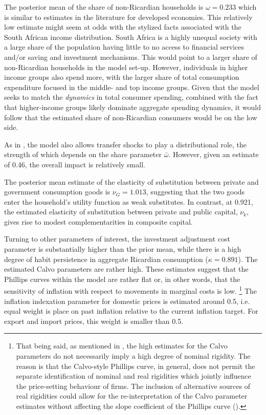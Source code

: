 \documentclass[a4paper,11pt]{article}
\numberwithin{equation}{section}
\begin{document}
	The posterior mean of the share of non-Ricardian households is $\omega=0.233$ which is similar to estimates in the literature for developed economies. This relatively low estimate might seem at odds with the stylized facts associated with the South African income distribution. South Africa is a highly unequal society with a large share of the population having little to no access to financial services and/or saving and investment mechanisms. This would point to a larger share of non-Ricardian households in the model set-up. However, individuals in higher income groups also spend more, with the larger share of total consumption expenditure focused in the middle- and top income groups. Given that the model seeks to match the \textit{dynamics} in total consumer spending, combined with the fact that higher-income groups likely dominate aggregate spending dynamics, it would follow that the estimated share of non-Ricardian consumers would be on the low side.
	
	As in \cite{coenen2013}, the model also allows transfer shocks to play a distributional role, the strength of which depends on the share parameter $\bar{\omega}$. However, given an estimate of 0.46, the overall impact is relatively small.
	
	The posterior mean estimate of the elasticity of substitution between private and government consumption goods is $\nu_G = 1.013$, suggesting that the two goods enter the household's utility function as weak substitutes. In contrast, at 0.921, the estimated elasticity of substitution between private and public capital, $\nu_k$, gives rise to modest complementarities in composite capital.    
	
	Turning to other parameters of interest, the investment adjustment cost parameter is substantially higher than the prior mean, while there is a high degree of habit persistence in aggregate Ricardian consumption ($\kappa=0.891$). The estimated Calvo parameters are rather high. These estimates suggest that the Phillips curves within the model are rather flat or, in other words, that the sensitivity of inflation with respect to movements in marginal costs is low. \footnote{That being said, as mentioned in \cite{christoffel2008}, the high estimates for the Calvo parameters do not necessarily imply a high degree of nominal rigidity. The reason is that	the Calvo-style Phillips curve, in general, does not permit the separate identification of nominal and real rigidities which jointly influence the price-setting behaviour of firms. The inclusion of alternative sources of real	rigidities could allow for the re-interpretation of the Calvo parameter estimates without affecting the slope coefficient of the Phillips curve (\citealp{christoffel2008}).} The inflation indexation parameter for domestic prices is estimated around 0.5, i.e. equal weight is place on past inflation relative to the current inflation target. For export and import prices, this weight is smaller than 0.5.
	
\end{document}
